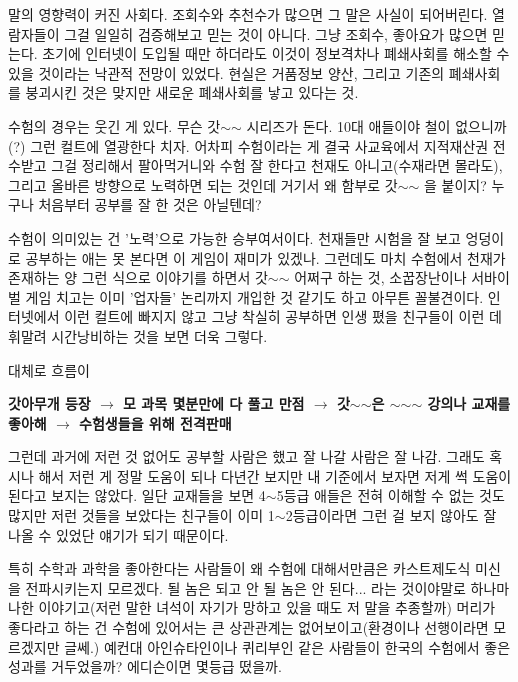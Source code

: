 말의 영향력이 커진 사회다.
조회수와 추천수가 많으면 그 말은 사실이 되어버린다.
열람자들이 그걸 일일히 검증해보고 믿는 것이 아니다. 그냥 조회수, 좋아요가 많으면 믿는다.
초기에 인터넷이 도입될 때만 하더라도 이것이 정보격차나 폐쇄사회를 해소할 수 있을 것이라는 낙관적 전망이 있었다.
현실은 거품정보 양산, 그리고 기존의 폐쇄사회를 붕괴시킨 것은 맞지만 새로운 폐쇄사회를 낳고 있다는 것.
\vspace{5mm}

수험의 경우는 웃긴 게 있다.
무슨 갓$\sim$$\sim$ 시리즈가 돈다. 10대 애들이야 철이 없으니까(?) 그런 컬트에 열광한다 치자.
어차피 수험이라는 게 결국 사교육에서 지적재산권 전수받고 그걸 정리해서 팔아먹거니와
수험 잘 한다고 천재도 아니고(수재라면 몰라도), 그리고 올바른 방향으로 노력하면 되는 것인데 거기서 왜 함부로 갓$\sim$$\sim$ 을 붙이지?
누구나 처음부터 공부를 잘 한 것은 아닐텐데?
\vspace{5mm}

수험이 의미있는 건 '노력'으로 가능한 승부여서이다.
천재들만 시험을 잘 보고 엉덩이로 공부하는 애는 못 본다면 이 게임이 재미가 있겠나.
그런데도 마치 수험에서 천재가 존재하는 양 그런 식으로 이야기를 하면서 갓$\sim$$\sim$ 어쩌구 하는 것,
소꿉장난이나 서바이벌 게임 치고는 이미 '업자들' 논리까지 개입한 것 같기도 하고 아무튼 꼴불견이다.
인터넷에서 이런 컬트에 빠지지 않고 그냥 착실히 공부하면 인생 폈을 친구들이 이런 데 휘말려 시간낭비하는 것을 보면 더욱 그렇다.
\vspace{5mm}

대체로 흐름이
\vspace{5mm}

\textbf{갓아무개 등장 $\rightarrow$ 모 과목 몇분만에 다 풀고 만점 $\rightarrow$ 갓$\sim$$\sim$은 $\sim$$\sim$$\sim$ 강의나 교재를 좋아해 $\rightarrow$ 수험생들을 위해 전격판매}
\vspace{5mm}

그런데 과거에 저런 것 없어도 공부할 사람은 했고 잘 나갈 사람은 잘 나감.
그래도 혹시나 해서 저런 게 정말 도움이 되나 다년간 보지만 내 기준에서 보자면 저게 썩 도움이 된다고 보지는 않았다.
일단 교재들을 보면 4$\sim$5등급 애들은 전혀 이해할 수 없는 것도 많지만
저런 것들을 보았다는 친구들이 이미 1$\sim$2등급이라면 그런 걸 보지 않아도 잘 나올 수 있었단 얘기가 되기 때문이다.
\vspace{5mm}

특히 수학과 과학을 좋아한다는 사람들이 왜 수험에 대해서만큼은 카스트제도식 미신을 전파시키는지 모르겠다.
될 놈은 되고 안 될 놈은 안 된다... 라는 것이야말로 하나마나한 이야기고(저런 말한 녀석이 자기가 망하고 있을 때도 저 말을 추종할까)
머리가 좋다라고 하는 건 수험에 있어서는 큰 상관관계는 없어보이고(환경이나 선행이라면 모르겠지만 글쎄.)
예컨대 아인슈타인이나 퀴리부인 같은 사람들이 한국의 수험에서 좋은 성과를 거두었을까? 에디슨이면 몇등급 떴을까.
\vspace{5mm}


